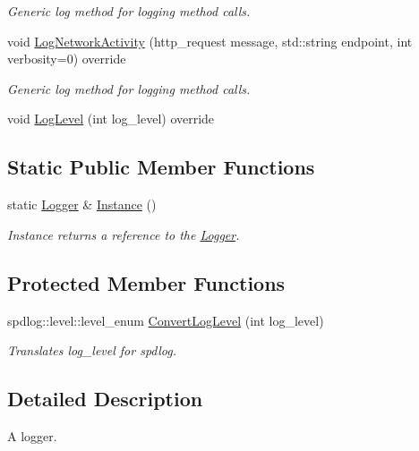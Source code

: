 \begin{DoxyCompactItemize}
\begin{DoxyCompactList}\small\item\em Generic log method for logging method calls. \end{DoxyCompactList}\item 
void \mbox{\hyperlink{classcadg__rest_1_1_logger_afb3fabc9999d6875709e8e58a7ef5e15}{Log\+Network\+Activity}} (http\+\_\+request message, std\+::string endpoint, int verbosity=0) override
\begin{DoxyCompactList}\small\item\em Generic log method for logging method calls. \end{DoxyCompactList}\item 
void \mbox{\hyperlink{classcadg__rest_1_1_logger_ae3bb452e78c2ceda9cdb0681f85af9e2}{Log\+Level}} (int log\+\_\+level) override
\end{DoxyCompactItemize}
\subsection*{Static Public Member Functions}
\begin{DoxyCompactItemize}
\item 
static \mbox{\hyperlink{classcadg__rest_1_1_logger}{Logger}} \& \mbox{\hyperlink{classcadg__rest_1_1_logger_acd53ca40ec816a668c5c5201a05e9f6c}{Instance}} ()
\begin{DoxyCompactList}\small\item\em Instance returns a reference to the \mbox{\hyperlink{classcadg__rest_1_1_logger}{Logger}}. \end{DoxyCompactList}\end{DoxyCompactItemize}
\subsection*{Protected Member Functions}
\begin{DoxyCompactItemize}
\item 
spdlog\+::level\+::level\+\_\+enum \mbox{\hyperlink{classcadg__rest_1_1_logger_a16fc28a4f058a0ccfccd894925668021}{Convert\+Log\+Level}} (int log\+\_\+level)
\begin{DoxyCompactList}\small\item\em Translates log\+\_\+level for spdlog. \end{DoxyCompactList}\end{DoxyCompactItemize}


\subsection{Detailed Description}
A logger. 

